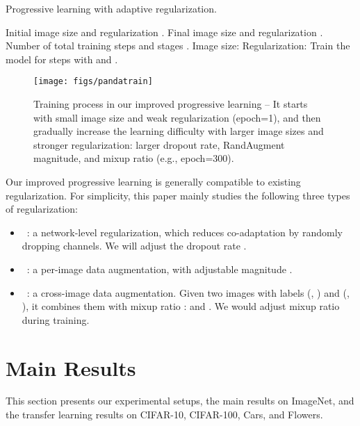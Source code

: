 \documentclass{article}
\begin{document}
 \begin{algorithm}[!htb]
   \small
    \caption{\small Progressive learning with adaptive regularization.}
    \label{alg:ptrain}
 \begin{algorithmic}
     Initial image size  and regularization .
     Final image size  and regularization .
     Number of total training steps  and stages .
\STATE Image size: 
    \STATE Regularization: 
    \STATE Train the model for  steps with  and .
\ENDFOR
 \end{algorithmic}
 \end{algorithm}

\begin{figure}[t]
    \centering
    \texttt{[image: figs/pandatrain]}
    \vskip -0.1in
    \caption{
        Training process in our improved progressive learning -- It starts with small image size and weak regularization (epoch=1), and then gradually increase the learning difficulty with larger image sizes and stronger regularization: larger dropout rate, RandAugment magnitude, and mixup ratio (e.g., epoch=300).
    }
    \label{fig:ptrain}
    \vskip -0.1in
\end{figure}
 
Our improved progressive learning is generally compatible to existing regularization. For simplicity, this paper mainly studies the following three types of regularization:
\begin{itemize}
    \setlength\itemsep{0em}
    \item{~\cite{dropout14}:} a network-level regularization, which reduces co-adaptation by randomly dropping channels. We will adjust the dropout rate .
    \item{~\cite{randaug20}:} a per-image data augmentation, with adjustable magnitude . 
    \item{~\cite{mixup18}:} a cross-image data augmentation. Given two images with labels (, ) and (, ), it combines them with mixup ratio :  and . We would adjust mixup ratio  during training.
\end{itemize}

\section{Main Results}
\label{sec:results}


This section presents our experimental setups, the main results on ImageNet, and the transfer learning results on CIFAR-10, CIFAR-100, Cars, and Flowers.
\end{document}
